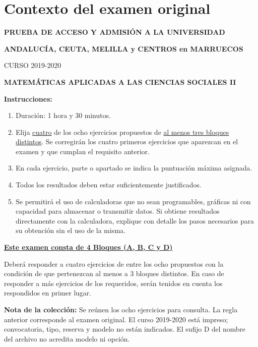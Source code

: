 \section*{Contexto del examen original}
\textbf{PRUEBA DE ACCESO Y ADMISIÓN A LA UNIVERSIDAD}\par
\textbf{ANDALUCÍA, CEUTA, MELILLA y CENTROS en MARRUECOS}\par
CURSO 2019-2020\par
\textbf{MATEMÁTICAS APLICADAS A LAS CIENCIAS SOCIALES II}

\textbf{Instrucciones:}
\begin{enumerate}[label=\textbf{\alph*)}]
  \item Duración: 1 hora y 30 minutos.
  \item Elija \underline{cuatro} de los ocho ejercicios propuestos de
  \underline{al menos tres bloques distintos}. Se corregirán los cuatro
  primeros ejercicios que aparezcan en el examen y que cumplan el requisito
  anterior.
  \item En cada ejercicio, parte o apartado se indica la puntuación máxima
  asignada.
  \item Todos los resultados deben estar suficientemente justificados.
  \item Se permitirá el uso de calculadoras que no sean programables,
  gráficas ni con capacidad para almacenar o transmitir datos. Si obtiene
  resultados directamente con la calculadora, explique con detalle los pasos
  necesarios para su obtención sin el uso de la misma.
\end{enumerate}
\textbf{\underline{Este examen consta de 4 Bloques (A, B, C y D)}}\par
Deberá responder a cuatro ejercicios de entre los ocho propuestos con la
condición de que pertenezcan al menos a 3 bloques distintos. En caso de
responder a más ejercicios de los requeridos, serán tenidos en cuenta los
respondidos en primer lugar.

\noindent\textbf{Nota de la colección:} Se reúnen los ocho ejercicios para
consulta. La regla anterior corresponde al examen original. El curso
2019-2020 está impreso; convocatoria, tipo, reserva y modelo no están indicados.
El sufijo D del nombre del archivo no acredita modelo ni opción.
\par\medskip

